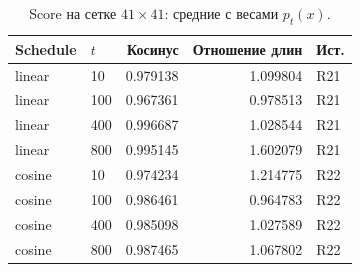 \begin{table}[H]\centering\small
\setlength{\tabcolsep}{4pt}
\caption{Score на сетке $41\times41$: средние с весами $p_t(x)$.}\label{tab:fields}
\begin{tabular}{llrrl}
\toprule
Schedule & $t$ & Косинус & Отношение длин & Ист. \\
\midrule
linear & 10 & 0.979138 & 1.099804 & R21 \\
linear & 100 & 0.967361 & 0.978513 & R21 \\
linear & 400 & 0.996687 & 1.028544 & R21 \\
linear & 800 & 0.995145 & 1.602079 & R21 \\
cosine & 10 & 0.974234 & 1.214775 & R22 \\
cosine & 100 & 0.986461 & 0.964783 & R22 \\
cosine & 400 & 0.985098 & 1.027589 & R22 \\
cosine & 800 & 0.987465 & 1.067802 & R22 \\
\bottomrule
\end{tabular}
\end{table}

